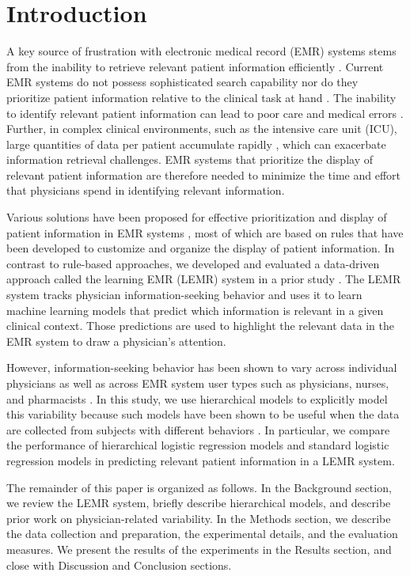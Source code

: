 \section{Introduction}
A key source of frustration with electronic medical record (EMR) systems stems from the inability to retrieve relevant patient information efficiently \cite{Nolan2017,Roman2017,Yang2011,Natarajan2010}. Current EMR systems do not possess sophisticated search capability nor do they prioritize patient information relative to the clinical task at hand \cite{Ruppel2020,Mazur2019}. The inability to identify relevant patient information can lead to poor care and medical errors \cite{Hall2004,Ahmed2011,Pollack2020}. Further, in complex clinical environments, such as the intensive care unit (ICU), large quantities of data per patient accumulate rapidly \cite{Manor-Shulman2008}, which can exacerbate information retrieval challenges. EMR systems that prioritize the display of relevant patient information are therefore needed to minimize the time and effort that physicians spend in identifying relevant information.

Various solutions have been proposed for effective prioritization and display of patient information in EMR systems \cite{Law2005, Koch2013,Wright2019,Pickering2015}, most of which are based on rules that have been developed to customize and organize the display of patient information. In contrast to rule-based approaches, we developed and evaluated a data-driven approach called the learning EMR (LEMR) system in a prior study \cite{King2018, King2019}. The LEMR system tracks physician information-seeking behavior and uses it to learn machine learning models that predict which information is relevant in a given clinical context. Those predictions are used to highlight the relevant data in the EMR system to draw a physician’s attention.

However, information-seeking behavior has been shown to vary across individual physicians as well as across EMR system user types such as physicians, nurses, and pharmacists \cite{Nolan2017,Ruppel2020}. In this study, we use hierarchical models to explicitly model this variability because such models have been shown to be useful when the data are collected from subjects with different behaviors \cite{gelman2006data}. In particular, we compare the performance of hierarchical logistic regression models and standard logistic regression models in predicting relevant patient information in a LEMR system.

The remainder of this paper is organized as follows. In the Background section, we review the LEMR system, briefly describe hierarchical models, and describe prior work on physician-related variability. In the Methods section, we describe the data collection and preparation, the experimental details, and the evaluation measures. We present the results of the experiments in the Results section, and close with Discussion and Conclusion sections.

